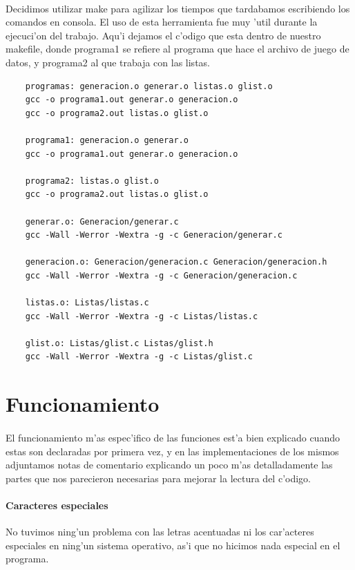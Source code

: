 \documentclass{article}
\begin{document}
	\paragraph{}
	Decidimos utilizar make para agilizar los tiempos que tardabamos escribiendo los comandos en consola. El uso de esta herramienta fue muy 'util durante la ejecuci'on del trabajo. Aqu'i dejamos el c'odigo que esta dentro de nuestro makefile, donde programa1 se refiere al programa que hace el archivo de juego de datos, y programa2 al que trabaja con las listas.
	\begin{verbatim}
	programas: generacion.o generar.o listas.o glist.o
	gcc -o programa1.out generar.o generacion.o
	gcc -o programa2.out listas.o glist.o
	
	programa1: generacion.o generar.o
	gcc -o programa1.out generar.o generacion.o
	
	programa2: listas.o glist.o 
	gcc -o programa2.out listas.o glist.o
	
	generar.o: Generacion/generar.c
	gcc -Wall -Werror -Wextra -g -c Generacion/generar.c
	
	generacion.o: Generacion/generacion.c Generacion/generacion.h
	gcc -Wall -Werror -Wextra -g -c Generacion/generacion.c
	
	listas.o: Listas/listas.c
	gcc -Wall -Werror -Wextra -g -c Listas/listas.c
	
	glist.o: Listas/glist.c Listas/glist.h
	gcc -Wall -Werror -Wextra -g -c Listas/glist.c
	\end{verbatim}
	\pagebreak
	
	\section{Funcionamiento}
	\paragraph{}
	El funcionamiento m'as espec'ifico de las funciones est'a bien explicado cuando estas son declaradas por primera vez, y en las implementaciones de los mismos adjuntamos notas de comentario explicando un poco m'as detalladamente las partes que nos parecieron necesarias para mejorar la lectura del c'odigo.
	\paragraph{Caracteres especiales}
	No tuvimos ning'un problema con las letras acentuadas ni los car'acteres especiales en ning'un sistema operativo, as'i que no hicimos nada especial en el programa.
\end{document}
